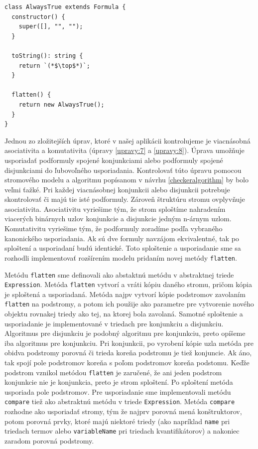 \begin{lstlisting}[float,caption={Trieda reprezentujúca tautológiu},label=classalwaystrue]
class AlwaysTrue extends Formula {
  constructor() {
    super([], "", "");
  }

  toString(): string {
    return `(*$\top$*)`;
  }

  flatten() {
    return new AlwaysTrue();
  }
}
\end{lstlisting}

Jednou zo zložitejších úprav, ktoré v našej aplikácii kontrolujeme je viacnásobná asociativita a komutativita (úpravy \eqref{upravy:7} a \eqref{upravy:8}). Úprava umožňuje usporiadať podformuly spojené konjunkciami alebo podformuly spojené disjunkciami do ľubovoľného usporiadania. Kontrolovať túto úpravu pomocou stromového modelu a algoritmu popísanom v návrhu \eqref{checkeralgorithm} by bolo veľmi ťažké. Pri každej viacnásobnej konjunkcii alebo disjunkcii potrebuje skontrolovať či majú tie isté podformuly. Zároveň štruktúru stromu ovplyvňuje asociativita. Asociativitu vyriešime tým, že strom sploštíme nahradením viacerých binárnych uzlov konjunkcie a disjunkcie jedným n-árnym uzlom. Komutativitu vyriešime tým, že podformuly zoradíme podľa vybraného kanonického usporiadania. Ak sú dve formuly navzájom ekvivalentné, tak po sploštení a usporiadaní budú identické. Toto sploštenie a usporiadanie sme sa rozhodli implementovať rozšírením modelu pridaním novej metódy \texttt{flatten}. 

\label{flatten}Metódu \texttt{flatten} sme definovali ako abstaktnú metódu v abstraktnej triede \texttt{Expre\-ssion}. Metóda \texttt{flatten} vytvorí a vráti kópiu daného stromu, pričom kópia je sploštená a usporiadaná. Metóda najpv vytvorí kópie podstromov zavolaním \texttt{flatten} na podstromy, a potom ich použije ako parametre pre vytvorenie nového objektu rovnakej triedy ako tej, na ktorej bola zavolaná. Samotné sploštenie a usporiadanie je implementované v triedach pre konjunkciu a disjunkciu. Algoritmus pre disjunkciu je podobný algoritmu pre konjunkciu, preto opíšeme iba algoritmus pre konjunkciu. Pri konjunkcii, po vyrobení kópie uzla metóda pre obidva podstromy porovná či trieda koreňa podstromu je tiež konjuncie. Ak áno, tak spojí pole podstromov koreňa s poľom podstromov koreňa podstomu. Keďže podstrom vznikol metódou \texttt{flatten} je zaručené, že ani jeden podstrom konjunkcie nie je konjunkcia, preto je strom sploštení. Po sploštení metóda usporiada pole podstromov. Pre usporiadanie sme implementovali metódu \texttt{compare} tiež ako abstraktnú metódu v triede \texttt{Expression}. Metóda \texttt{compare} rozhodne ako usporiadať stromy, tým že najprv porovná mená konštruktorov, potom porovná prvky, ktoré majú niektoré triedy (ako napríklad \texttt{name} pri triedach termov alebo \texttt{variableName} pri triedach kvantifikátorov) a nakoniec zaradom porovná podstromy.


